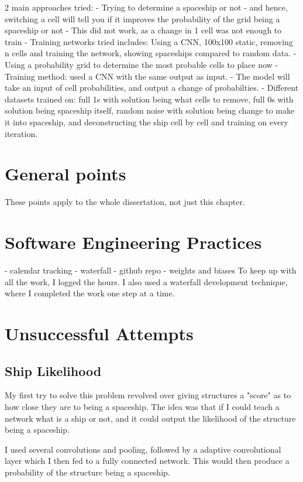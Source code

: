 \documentclass{l4proj}
\begin{document}
2 main approaches tried:
- Trying to determine a spaceship or not
    - and hence, switching a cell will tell you if it improves the probability of the grid being a spaceship or not
    - This did not work, as a change in 1 cell was not enough to train
    - Training networks tried includes: Using a CNN, 100x100 static, removing n cells and training the network, showing spaceships compared to random data.
- Using a probability grid to determine the most probable cells to place now 
    - Training method: used a CNN with the same output as input. 
    - The model will take an input of cell probabilities, and output a change of probabilties.
    - Different datasets trained on: full 1s with solution being what cells to remove, full 0s with solution being spaceship itself, random noise with solution being change to make it into spaceship, and deconstructing the ship cell by cell and training on every iteration.

\section{General points}
These points apply to the whole dissertation, not just this chapter.


\section{Software Engineering Practices}

- calendar tracking
- waterfall
- github repo
- weights and biases
To keep up with all the work, I logged the hours. I also used a waterfall development technique, where I completed the work one step at a time. 


\section {Unsuccessful Attempts}

\subsection{Ship Likelihood}
My first try to solve this problem revolved over giving structures a "score" as to how close they are to being a spaceship. The idea was that if I could teach a network what is a ship or not, and it could output the likelihood of the structure being a spaceship. 

I used several convolutions and pooling, followed by a adaptive convolutional layer which I then fed to a fully connected network. This would then produce a probability of the structure being a spaceship.
\end{document}
